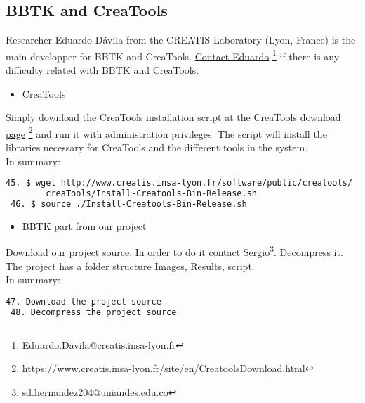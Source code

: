 \documentclass[12pt]{article}
\begin{document}
\subsection{BBTK and CreaTools}

Researcher Eduardo D\'{a}vila from the CREATIS Laboratory (Lyon, France) is the main developper for BBTK and CreaTools. \href{mailito:Eduardo.Davila@creatis.insa-lyon.fr}{\color{blue} Contact Eduardo}
\footnote{\url{Eduardo.Davila@creatis.insa-lyon.fr}} if there is any difficulty related with BBTK and CreaTools.\\

\begin{itemize}
\item CreaTools
\end{itemize}

Simply download the CreaTools installation script at the \href{https://www.creatis.insa-lyon.fr/site/en/CreatoolsDownload.html}{\color{blue} CreaTools download page}
\footnote{\url{https://www.creatis.insa-lyon.fr/site/en/CreatoolsDownload.html}} and run it with administration privileges. The script will install the libraries necessary for CreaTools and the different tools in the system. \\

In summary:\\

\noindent
\small
\begin{lstlisting}[language=bash]
 45. $ wget http://www.creatis.insa-lyon.fr/software/public/creatools/
        creaTools/Install-Creatools-Bin-Release.sh 
 46. $ source ./Install-Creatools-Bin-Release.sh 
\end{lstlisting}

\begin{itemize}
\item BBTK part from our project
\end{itemize}

Download our project source. In order to do it \href{mailito:sd.hernandez204@uniandes.edu.co}{\color{blue} contact Sergio}\footnote{\url{sd.hernandez204@uniandes.edu.co}}. Decompress it. The project has a folder structure Images, Results, script.\\

In summary:\\

\noindent
\small
\begin{lstlisting}[language=bash]
 47. Download the project source
 48. Decompress the project source
\end{lstlisting}
\end{document}
